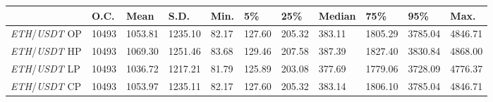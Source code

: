 \begin{tabular}{lllllllllll}
\toprule
 & \textbf{O.C.} & \textbf{Mean} & \textbf{S.D.} & \textbf{Min.} & \textbf{5\%} & \textbf{25\%} & \textbf{Median} & \textbf{75\%} & \textbf{95\%} & \textbf{Max.} \\
\midrule
\emph{ETH}/\emph{USDT} OP & 10493 & 1053.81 & 1235.10 & 82.17 & 127.60 & 205.32 & 383.11 & 1805.29 & 3785.04 & 4846.71 \\
\emph{ETH}/\emph{USDT} HP & 10493 & 1069.30 & 1251.46 & 83.68 & 129.46 & 207.58 & 387.39 & 1827.40 & 3830.84 & 4868.00 \\
\emph{ETH}/\emph{USDT} LP & 10493 & 1036.72 & 1217.21 & 81.79 & 125.89 & 203.08 & 377.69 & 1779.06 & 3728.09 & 4776.37 \\
\emph{ETH}/\emph{USDT} CP & 10493 & 1053.97 & 1235.11 & 82.17 & 127.60 & 205.32 & 383.14 & 1806.10 & 3785.04 & 4846.71 \\
\bottomrule
\end{tabular}
